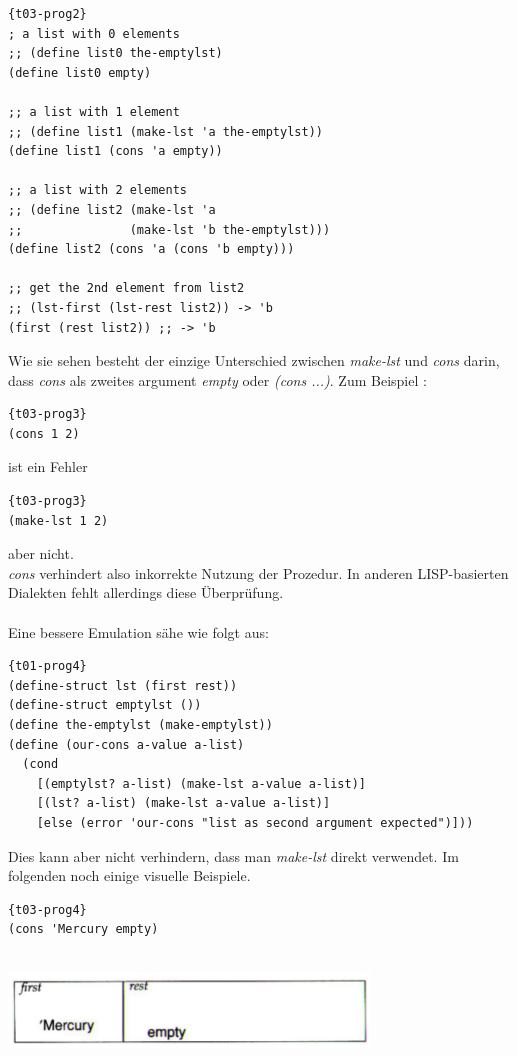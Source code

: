 \begin{lstlisting}{t03-prog2}
; a list with 0 elements
;; (define list0 the-emptylst)
(define list0 empty)

;; a list with 1 element
;; (define list1 (make-lst 'a the-emptylst))
(define list1 (cons 'a empty))

;; a list with 2 elements
;; (define list2 (make-lst 'a
;;               (make-lst 'b the-emptylst)))
(define list2 (cons 'a (cons 'b empty)))

;; get the 2nd element from list2
;; (lst-first (lst-rest list2)) -> 'b
(first (rest list2)) ;; -> 'b
\end{lstlisting}

Wie sie sehen besteht der einzige Unterschied zwischen \textit{make-lst} und \textit{cons} darin, dass \textit{cons} als zweites argument \textit{empty} oder \textit{(cons ...)}. Zum Beispiel :

\begin{lstlisting}{t03-prog3}
(cons 1 2)
\end{lstlisting}
ist ein Fehler
\begin{lstlisting}{t03-prog3}
(make-lst 1 2)
\end{lstlisting}
aber nicht.\\
\textit{cons} verhindert also inkorrekte Nutzung der Prozedur. In anderen LISP-basierten Dialekten fehlt allerdings diese Überprüfung. \\\\
Eine bessere Emulation sähe wie folgt aus:

\begin{lstlisting}{t01-prog4}
(define-struct lst (first rest))
(define-struct emptylst ())
(define the-emptylst (make-emptylst))
(define (our-cons a-value a-list)
  (cond
    [(emptylst? a-list) (make-lst a-value a-list)]
    [(lst? a-list) (make-lst a-value a-list)]
    [else (error 'our-cons "list as second argument expected")]))
\end{lstlisting}
Dies kann aber nicht verhindern, dass man \textit{make-lst} direkt verwendet. Im folgenden noch einige visuelle Beispiele.

\begin{lstlisting}{t03-prog4}
(cons 'Mercury empty)
\end{lstlisting}
\\
\includegraphics[height=2cm]{Bilder/T03_00.png}

